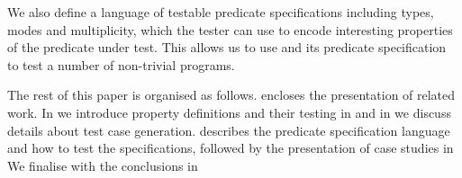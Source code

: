 




We also define a language of testable predicate specifications including
types, modes and multiplicity, which the tester can use to encode
interesting properties of the predicate under test.
%
This allows us to  use \plqc{} and its predicate specification to test a
number of non-trivial programs.




The rest of this paper is organised as follows.
%
 encloses the presentation of related work.
%
In  we introduce property definitions and their
testing in \plqc{} and in  we discuss details
about test case generation.
%
 describes the predicate specification language
and how to test the specifications, followed by the presentation of case
studies in 
%
We finalise with the conclusions in 


